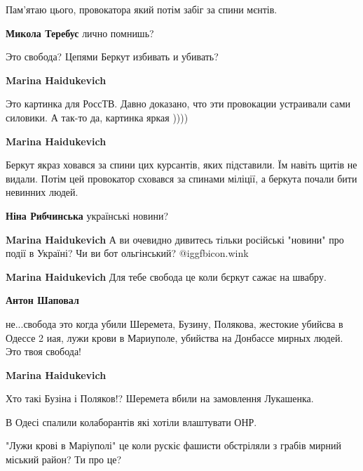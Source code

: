  
 
 
 
 


Пам'ятаю цього, провокатора який потім забіг за спини мєнтів.

\textbf{Микола Теребус} лично помнишь?

Это свобода? Цепями Беркут избивать и убивать?

\textbf{Marina Haidukevich} 

Это картинка для РоссТВ. Давно доказано, что эти провокации устраивали сами
силовики. А так-то да, картинка яркая ))))

\textbf{Marina Haidukevich}

Беркут якраз ховався за спини цих курсантів, яких підставили. Їм навіть щитів
не видали. Потім цей провокатор сховався за спинами міліції, а беркута почали
бити невинних людей.

\textbf{Ніна Рибчинська} українські новини?

\textbf{Marina Haidukevich}
А ви очевидно дивитесь тільки російські "новини" про події в Україні? Чи ви бот ольгінський?  @igg{fbicon.wink} 

\textbf{Marina Haidukevich} Для тебе свобода це коли бєркут сажає на швабру.

\textbf{Антон Шаповал} 

не...свобода это когда убили Шеремета, Бузину, Полякова, жестокие убийсва в
Одессе 2 иая, лужи крови в Мариуполе, убийства на Донбассе мирных людей. Это
твоя свобода!

\textbf{Marina Haidukevich} 

Хто такі Бузіна і Поляков!? Шеремета вбили на замовлення Лукашенка.

В Одесі спалили колаборантів які хотіли влаштувати ОНР.

"Лужи крові в Маріуполі" це коли рускіє фашисти обстріляли з грабів мирний
міський район? Ти про це?

